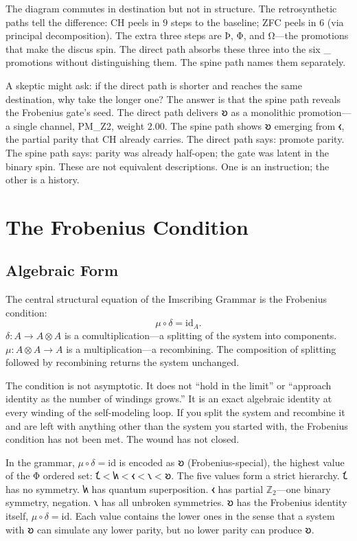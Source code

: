 \documentclass[12pt,twoside]{book}
\theoremstyle{definition}
\newcommand{\ZFCt}{\text{ZFC}_{\tau}}
\newcommand{\moebius}{\mu \circ \delta = \mathrm{id}}
\begin{document}
The diagram commutes in destination but not in structure. The retrosynthetic paths tell
the difference: CH peels in $9$ steps to the baseline; ZFC peels in $6$ (via principal
decomposition). The extra three steps are Þ, Φ, and Ω---the promotions that make the
discus spin. The direct path absorbs these three into the six \ZFCt{} promotions without
distinguishing them. The spine path names them separately.

A skeptic might ask: if the direct path is shorter and reaches the same destination, why
take the longer one? The answer is that the spine path reveals the Frobenius gate's seed.
The direct path delivers 𐑹 as a monolithic promotion---a single channel, PM\_Z2, weight
$2.00$. The spine path shows 𐑹 emerging from 𐑬, the partial parity that CH already
carries. The direct path says: promote parity. The spine path says: parity was already
half-open; the gate was latent in the binary spin. These are not equivalent descriptions.
One is an instruction; the other is a history.

\chapter{The Frobenius Condition}

\section{Algebraic Form}

The central structural equation of the Imscribing Grammar is the Frobenius condition:
\begin{equation}
\mu \circ \delta = \mathrm{id}_A.
\end{equation}
$\delta: A \to A \otimes A$ is a comultiplication---a splitting of the system into
components. $\mu: A \otimes A \to A$ is a multiplication---a recombining. The composition
of splitting followed by recombining returns the system unchanged.

The condition is not asymptotic. It does not ``hold in the limit'' or ``approach identity
as the number of windings grows.'' It is an exact algebraic identity at every winding of
the self-modeling loop. If you split the system and recombine it and are left with anything
other than the system you started with, the Frobenius condition has not been met. The wound
has not closed.

In the grammar, $\moebius$ is encoded as 𐑹 (Frobenius-special), the highest value of the
Φ ordered set: $𐑗 < 𐑿 < 𐑬 < 𐑯 < 𐑹$. The five values
form a strict hierarchy. 𐑗 has no symmetry. 𐑿 has quantum superposition. 𐑬 has partial
$\mathbb{Z}_2$---one binary symmetry, negation. 𐑯 has all unbroken symmetries. 𐑹 has the
Frobenius identity itself, $\mu \circ \delta = \mathrm{id}$. Each value contains the lower
ones in the sense that a system with 𐑹 can simulate any lower parity, but no lower parity
can produce 𐑹.
\end{document}
